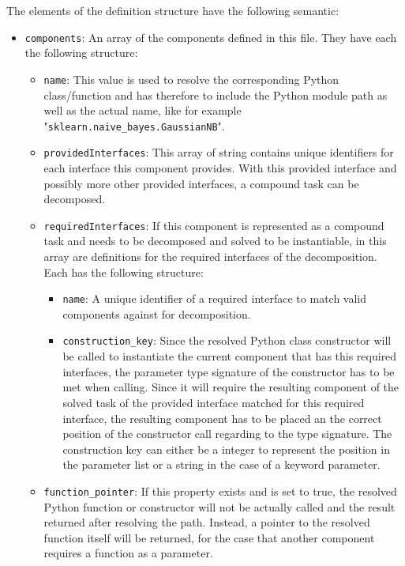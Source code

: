 The elements of the definition structure have the following semantic:
\begin{itemize}
	\item \texttt{components}: An array of the components defined in this file. They have each the following structure:
		\begin{itemize}[label=\textbullet]
			\item \texttt{name}: This value is used to resolve the corresponding Python class/function and has therefore to include the Python module path as well as the actual name, like for example "\texttt{sklearn.naive\_bayes.GaussianNB}".
			\item \texttt{providedInterfaces}: This array of string contains unique identifiers for each interface this component provides. With this provided interface and possibly more other provided interfaces, a compound task can be decomposed. 
            \item \texttt{requiredInterfaces}: If this component is represented as a compound task and needs to be decomposed and solved to be instantiable, in this array are definitions for the required interfaces of the decomposition. Each has the following structure:
            \begin{itemize}[label=\textbullet]
                \item \texttt{name}: A unique identifier of a required interface to match valid components against for decomposition.
                \item \texttt{construction\_key}: Since the resolved Python class constructor will be called to instantiate the current component that has this required interfaces, the parameter type signature of the constructor has to be met when calling.
                    Since it will require the resulting component of the solved task of the provided interface matched for this required interface, the resulting component has to be placed an the correct position of the constructor call regarding to the type signature.
                    The construction key can either be a integer to represent the position in the parameter list or a string in the case of a keyword parameter. 
            \end{itemize}
            \item \texttt{function\_pointer}: If this property exists and is set to true, the resolved Python function or constructor will not be actually called and the result returned after resolving the path.
                Instead, a pointer to the resolved function itself will be returned, for the case that another component requires a function as a parameter.

\end{itemize}
\end{itemize}
